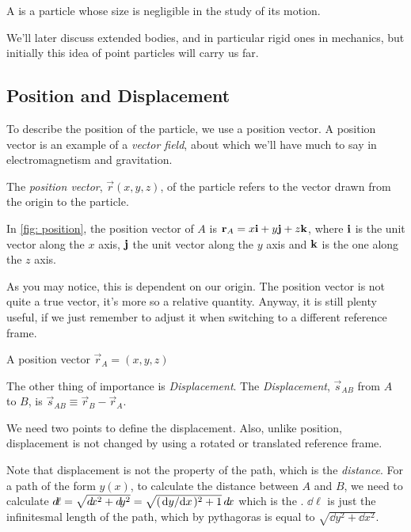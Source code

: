 \begin{definition}
    A  is a particle whose size is negligible in the study of its motion.
\end{definition}

We'll later discuss extended bodies, and in particular rigid ones in mechanics, but initially this idea 
of point particles will carry us far. 

\subsection{Position and Displacement}

To describe the position of the particle, we use a position vector. A position vector is an example of a 
\emph{vector field}, about which we'll have much to say in electromagnetism and gravitation.

\begin{definition}
    The \emph{position vector}, $\vec{r}(x, y, z)$, of the particle refers to the vector drawn from the origin to the particle.
\end{definition}


In \cref{fig: position}, the position vector of $A$ is $\mathbf{\boldsymbol{r}}_A = x\mathbf{\boldsymbol{i}} + y\mathbf{\boldsymbol{j}} + z\mathbf{\boldsymbol{k}}$, where 
$\mathbf{\boldsymbol{i}}$ is the unit vector along the $x$ axis, $\mathbf{\boldsymbol{j}}$ the unit vector along the $y$ axis and $\mathbf{\boldsymbol{k}}$ is 
the one along the $z$ axis.

As you may notice, this is dependent on our origin. The position vector is not quite
a true vector, it's more so a relative quantity. Anyway, it is still plenty useful,
if we just remember to adjust it when switching to a different reference frame.

\begin{marginfigure}
    \hspace{-1.2em}
    \caption{A position vector $\vec{r}_A = (x, y, z)$} 
    \label{fig: position}
\end{marginfigure}

The other thing of importance is \emph{Displacement}. 
The  \emph{Displacement}, $\vec{s}_{AB}$ from $A$ to $B$, is $\vec{s}_{AB} \equiv \vec{r}_B - \vec{r}_A$.

We need two points to define the displacement. Also, unlike position, displacement 
is not changed by using a rotated or translated reference frame. 

Note that displacement is not the property of the path, which is the \emph{distance}. For a path 
of the form $y(x)$, to calculate the distance between $A$ and $B$, we need to calculate $\dd{\ell} = 
\sqrt{\dd{x}^2 + \dd{y}^2} = \sqrt{(\dv*{y}{x})^2 + 1}\dd{x}$ which is the .
$\dd{\ell}$ is just the infinitesmal length of the path, which by pythagoras is equal to $\sqrt{\dd{y}^2 + \dd{x}^2}$.  

